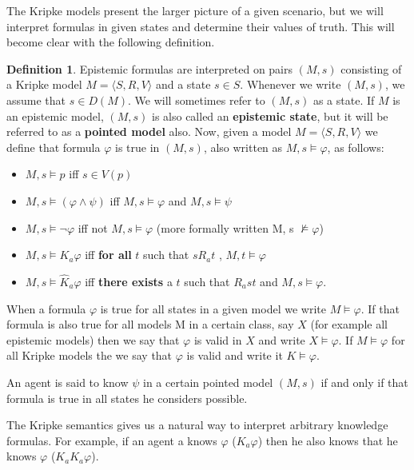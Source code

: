 \documentclass[12pt]{article}
\numberwithin{equation}{section}
\theoremstyle{definition}
\theoremstyle{definition}
\newtheorem{defn}[thm]{Definition}
\theoremstyle{remark}
\begin{document}
The Kripke models present the larger picture of a given scenario, but we will interpret formulas in given states and determine their values of truth. This will become clear with the following definition.

\begin{defn}

Epistemic formulas are interpreted on pairs $(M, s)$ consisting of a Kripke model $M = \langle S, R, V\rangle$ and a state $s \in S$. Whenever we write $(M, s)$, we assume that $s \in D(M)$. We will sometimes refer to $(M, s)$ as a state. If $M$ is an epistemic model, $(M, s)$ is also called an \textbf{epistemic state}, but it will be referred to as a \textbf{pointed model} also.
Now, given a model $M = \langle S, R, V\rangle$ we define that formula $\varphi$ is true in $(M, s)$, also written as $M,s \models \varphi$, as follows:
\begin{itemize}
   \item $M,s \models p$ iff $s \in V (p)$
\item $M ,s \models (\varphi \land \psi)$ iff $M, s \models \varphi$  and $M, s\models \psi$ 
\item $M, s \models \neg\varphi$ iff not $M, s \models \varphi$ (more formally written M, s $\not\models\varphi$)
\item $M, s \models K_a\varphi$ iff \textbf{ for all} $t$ such that $sR_a t$ , $M, t \models \varphi$
\item $M, s \models \hat{K}_a\varphi$ iff \textbf{there exists} a $t$ such that $R_a st$ and $M, s\models\varphi.$
\end{itemize}
When a formula $\varphi$ is true for all states in a given model we write $M\models\varphi$. If that formula is also true for all models M in a certain class, say $X$ (for example all epistemic models) then we say that $\varphi$ is valid in $X$ and write $X\models\varphi$.
If $M\models\varphi$ for all Kripke models the we say that $\varphi$ is valid and write it $K\models\varphi$.

An agent is said to know $\psi$ in a certain pointed model $(M, s)$ if and only if that formula is true in all states he considers possible.

The Kripke semantics gives us a natural way to interpret arbitrary knowledge formulas. For example, if an agent a knows $\varphi$ ($K_a\varphi$) then he also knows that he knows $\varphi$ ($K_aK_a\varphi$).


\end{defn}
\end{document}

